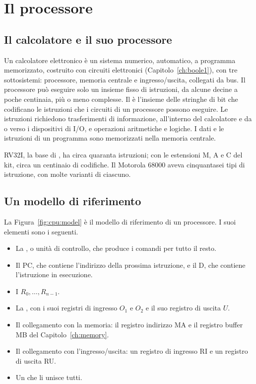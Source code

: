\section{Il processore}

\subsection{Il calcolatore e il suo processore}

Un calcolatore elettronico è un sistema numerico, automatico, a programma
memorizzato, costruito con circuiti elettronici (Capitolo~\ref{ch:boole1}),
con tre sottosistemi: processore, memoria centrale e ingresso/uscita,
collegati da bus. Il processore può eseguire solo un insieme fisso di
istruzioni, da alcune decine a poche centinaia, più o meno complesse. Il
 è l'insieme delle stringhe di bit che codificano le
istruzioni che i circuiti di un processore possono eseguire. Le istruzioni
richiedono trasferimenti di informazione, all'interno del calcolatore e da o
verso i dispositivi di I/O, e operazioni aritmetiche e logiche. I dati e le
istruzioni di un programma sono memorizzati nella memoria centrale.

RV32I, la base di \riscv, ha circa quaranta istruzioni; con le estensioni M, A
e C del kit, circa un centinaio di codifiche. Il Motorola 68000 aveva
cinquantasei tipi di istruzione, con molte varianti di ciascuno.

\subsection{Un modello di riferimento}

La Figura~\ref{fig:cpu:model} è il modello di riferimento di un processore. I
suoi elementi sono i seguenti.

\begin{itemize}
\item La , o unità di controllo, che produce i comandi
  per tutto il resto.
\item Il  PC, che contiene l'indirizzo della prossima
  istruzione, e il  D, che contiene l'istruzione
  in esecuzione.
\item I  $R_0,\dots,R_{n-1}$.
\item La , con i suoi registri di ingresso $O_1$ e $O_2$ e il suo
  registro di uscita $U$.
\item Il collegamento con la memoria: il registro indirizzo MA e il registro
  buffer MB del Capitolo~\ref{ch:memory}.
\item Il collegamento con l'ingresso/uscita: un registro di ingresso RI e un
  registro di uscita RU.
\item Un  che li unisce tutti.
\end{itemize}

